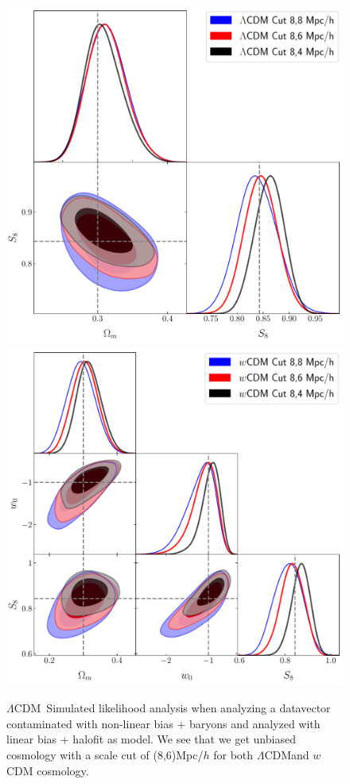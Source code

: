 \documentclass[fleqn,usenatbib]{mnras}
\newcommand{\lcdm}{$\Lambda$CDM}
\begin{document}
\begin{figure}
\includegraphics[width=\columnwidth]{figs/compare_cosmo_lcdm_8_8-6-4_simple.pdf}
\includegraphics[width=\columnwidth]{figs/compare_cosmo_wcdm_8_8-6-4_simple.pdf}
\caption[]{\lcdm\ Simulated likelihood analysis when analyzing a datavector contaminated with non-linear bias + baryons and analyzed with linear bias + halofit as model. We see that we get unbiased cosmology with a scale cut of (8,6)Mpc/$h$ for both \lcdm and $w$CDM cosmology. }
\label{fig:sim_lin}
\end{figure}
\end{document}
